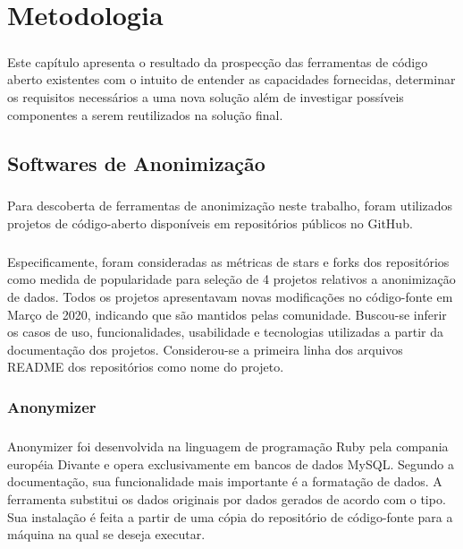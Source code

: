 \chapter{Metodologia}
\label{cap3}

\paragraph{} Este capítulo apresenta o resultado da prospecção das ferramentas de código aberto existentes com o intuito de entender as capacidades fornecidas, determinar os requisitos necessários a uma nova solução além de investigar possíveis componentes a serem reutilizados na solução final.

\section{Softwares de Anonimização}

\paragraph{} Para descoberta de ferramentas de anonimização neste trabalho, foram utilizados projetos de código-aberto disponíveis em repositórios públicos no GitHub. 

\paragraph{} Especificamente, foram consideradas as métricas de stars e forks dos repositórios como medida de popularidade para seleção de 4 projetos relativos a anonimização de dados. Todos os projetos apresentavam novas modificações no código-fonte em Março de 2020, indicando que são mantidos pelas comunidade. Buscou-se inferir os casos de uso, funcionalidades, usabilidade e tecnologias utilizadas a partir da documentação dos projetos. Considerou-se a primeira linha dos arquivos README dos repositórios como nome do projeto.

\subsection{Anonymizer}

\paragraph{} Anonymizer\cite{Anonymizer} foi desenvolvida na linguagem de programação Ruby pela compania européia Divante e opera exclusivamente em bancos de dados MySQL. Segundo a documentação, sua funcionalidade mais importante é a formatação de dados. A ferramenta substitui os dados originais por dados gerados de acordo com o tipo. Sua instalação é feita a partir de uma cópia do repositório de código-fonte para a máquina na qual se deseja executar.

